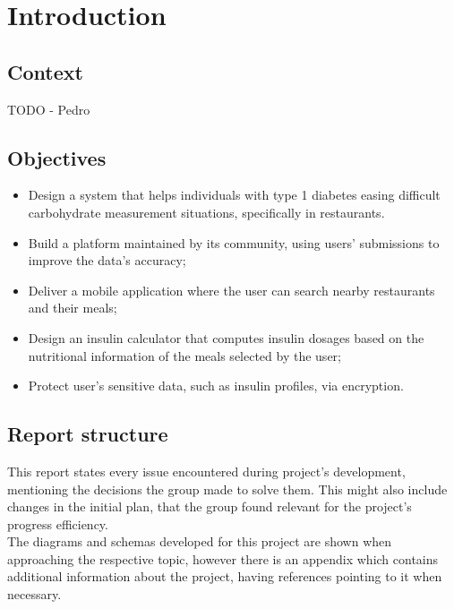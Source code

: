 %
%

\chapter{Introduction}

\section{Context}

TODO - Pedro\\

\section{Objectives}

\begin{itemize}
    \item Design a system that helps individuals with type 1 diabetes easing difficult carbohydrate measurement situations, specifically in restaurants.
    \item Build a platform maintained by its community, using users' submissions to improve the data's accuracy;
    \item Deliver a mobile application where the user can search nearby restaurants and their meals;
    \item Design an insulin calculator that computes insulin dosages based on the nutritional information of the meals selected by the user;
    \item Protect user's sensitive data, such as insulin profiles, via encryption.
\end{itemize}

\section{Report structure}

This report states every issue encountered during project's development, mentioning the 
decisions the group made to solve them. This might also include changes in the
initial plan, that the group found relevant for the project's progress efficiency.\\

The diagrams and schemas developed for this project are shown when approaching the respective topic,
however there is an appendix which contains additional information about the project, having 
references pointing to it when necessary.